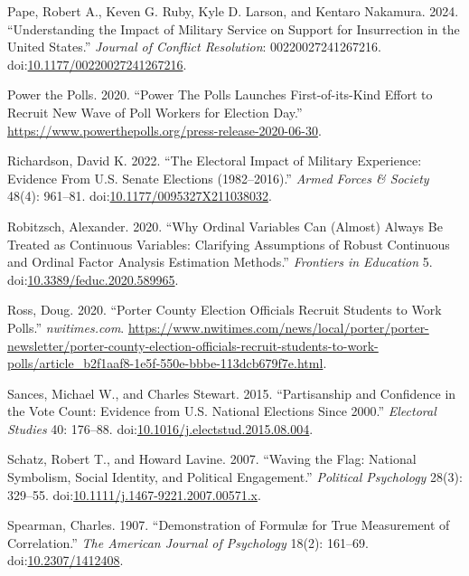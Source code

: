 \documentclass[
  12pt,
  letterpaper,
]{article}
\newlength{\cslhangindent}
\newenvironment{CSLReferences}[2] %
 {\begin{list}{}{%
  \setlength{\itemindent}{0pt}
  \setlength{\leftmargin}{0pt}
  \setlength{\parsep}{0pt}
  \ifodd #1
   \setlength{\leftmargin}{\cslhangindent}
   \setlength{\itemindent}{-1\cslhangindent}
  \fi
  \setlength{\itemsep}{#2\baselineskip}}}
 {\end{list}}
\begin{document}
\begin{CSLReferences}{1}{1}
Pape, Robert A., Keven G. Ruby, Kyle D. Larson, and Kentaro Nakamura.
2024. {``Understanding the {Impact} of {Military Service} on {Support}
for {Insurrection} in the {United States}.''} \emph{Journal of Conflict
Resolution}: 00220027241267216.
doi:\href{https://doi.org/10.1177/00220027241267216}{10.1177/00220027241267216}.

Power the Polls. 2020. {``Power {The Polls Launches First-of-its-Kind
Effort} to {Recruit New Wave} of {Poll Workers} for {Election Day}.''}
\url{https://www.powerthepolls.org/press-release-2020-06-30}.

Richardson, David K. 2022. {``The {Electoral Impact} of {Military
Experience}: {Evidence From U}.{S}. {Senate Elections} (1982--2016).''}
\emph{Armed Forces \& Society} 48(4): 961--81.
doi:\href{https://doi.org/10.1177/0095327X211038032}{10.1177/0095327X211038032}.

Robitzsch, Alexander. 2020. {``Why {Ordinal Variables Can} ({Almost})
{Always Be Treated} as {Continuous Variables}: {Clarifying Assumptions}
of {Robust Continuous} and {Ordinal Factor Analysis Estimation
Methods}.''} \emph{Frontiers in Education} 5.
doi:\href{https://doi.org/10.3389/feduc.2020.589965}{10.3389/feduc.2020.589965}.

Ross, Doug. 2020. {``Porter {County} Election Officials Recruit Students
to Work Polls.''} \emph{nwitimes.com}.
\url{https://www.nwitimes.com/news/local/porter/porter-newsletter/porter-county-election-officials-recruit-students-to-work-polls/article_b2f1aaf8-1e5f-550e-bbbe-113dcb679f7e.html}.

Sances, Michael W., and Charles Stewart. 2015. {``Partisanship and
Confidence in the Vote Count: {Evidence} from {U}.{S}. National
Elections Since 2000.''} \emph{Electoral Studies} 40: 176--88.
doi:\href{https://doi.org/10.1016/j.electstud.2015.08.004}{10.1016/j.electstud.2015.08.004}.

Schatz, Robert T., and Howard Lavine. 2007. {``Waving the {Flag}:
{National Symbolism}, {Social Identity}, and {Political Engagement}.''}
\emph{Political Psychology} 28(3): 329--55.
doi:\href{https://doi.org/10.1111/j.1467-9221.2007.00571.x}{10.1111/j.1467-9221.2007.00571.x}.

Spearman, Charles. 1907. {``Demonstration of {Formulæ} for {True
Measurement} of {Correlation}.''} \emph{The American Journal of
Psychology} 18(2): 161--69.
doi:\href{https://doi.org/10.2307/1412408}{10.2307/1412408}.


\end{CSLReferences}
\end{document}
